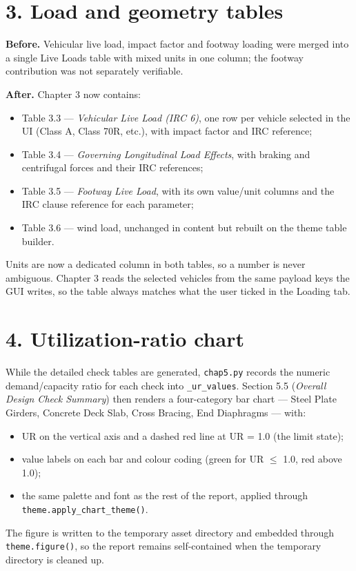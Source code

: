 \documentclass[11pt,a4paper]{article}
\newcommand{\code}[1]{\texttt{\small #1}}
\begin{document}
\section{3. Load and geometry tables}

\textbf{Before.} Vehicular live load, impact factor and footway loading were merged
into a single Live Loads table with mixed units in one column; the footway
contribution was not separately verifiable.

\textbf{After.} Chapter 3 now contains:
\begin{itemize}
  \item Table 3.3 --- \emph{Vehicular Live Load (IRC 6)}, one row per vehicle selected
        in the UI (Class A, Class 70R, etc.), with impact factor and IRC reference;
  \item Table 3.4 --- \emph{Governing Longitudinal Load Effects}, with braking and
        centrifugal forces and their IRC references;
  \item Table 3.5 --- \emph{Footway Live Load}, with its own value/unit columns and
        the IRC clause reference for each parameter;
  \item Table 3.6 --- wind load, unchanged in content but rebuilt on the theme table
        builder.
\end{itemize}
Units are now a dedicated column in both tables, so a number is never ambiguous.
Chapter 3 reads the selected vehicles from the same payload keys the GUI writes, so
the table always matches what the user ticked in the Loading tab.

\section{4. Utilization-ratio chart}

While the detailed check tables are generated, \code{chap5.py} records the numeric
demand/capacity ratio for each check into \code{\_ur\_values}. Section 5.5
(\emph{Overall Design Check Summary}) then renders a four-category bar chart ---
Steel Plate Girders, Concrete Deck Slab, Cross Bracing, End Diaphragms --- with:
\begin{itemize}
  \item UR on the vertical axis and a dashed red line at UR = 1.0 (the limit state);
  \item value labels on each bar and colour coding (green for UR $\leq$ 1.0,
        red above 1.0);
  \item the same palette and font as the rest of the report, applied through
        \code{theme.apply\_chart\_theme()}.
\end{itemize}
The figure is written to the temporary asset directory and embedded through
\code{theme.figure()}, so the report remains self-contained when the temporary
directory is cleaned up.
\end{document}
